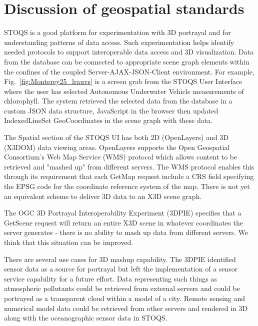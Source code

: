 \documentclass[annualconference]{acmsiggraph}  %
\begin{document}
\section{Discussion of geospatial standards}
STOQS is a good platform for experimentation with 3D portrayal and for understanding patterns of data access. Such experimentation helps identify needed protocols to support interoperable data access and 3D visualization.
Data from the database can be connected to appropriate scene graph elements within the confines of the coupled Server-AJAX-JSON-Client environment. For example, 
Fig.~\ref{fig:Monterey25_lrauvs} is a screen grab from the STOQS User Interface where the user has selected Autonomous Underwater Vehicle measurements of chlorophyll. The system retrieved the selected data from the database in a custom JSON data structure, JavaScript in the browser then updated IndexedLineSet GeoCoordinates in the scene graph with these data. 

The Spatial section of the STOQS UI has both 2D (OpenLayers) and 3D (X3DOM) data viewing areas. OpenLayers supports the Open Geospatial Consortium's Web Map Service (WMS) protocol which allows content to be retrieved and "mashed up" from different servers. The WMS protocol enables this through its requirement that each GetMap request include a CRS field specifying the EPSG code for the coordinate reference system of the map.  There is not yet an equivalent scheme to deliver 3D data to an X3D scene graph.

The OGC 3D Portrayal Interoperability Experiment (3DPIE) \cite{3DPIE} specifies that a GetScene request will return an entire X3D scene in whatever coordinates the server generates - there is no ability to mash up data from different servers. We think that this situation can be improved. 

There are several use cases for 3D mashup capability. The 3DPIE identified sensor data as a source for portrayal but left the implementation of a sensor service capability for a future effort. Data representing such things as atmospheric pollutants could be retrieved from external servers and could be portrayed as a transparent cloud within a model of a city. 
Remote sensing and numerical model data could be retrieved from other servers and rendered in 3D along with the oceanographic sensor data in STOQS.



\nocite{*}

\end{document}
